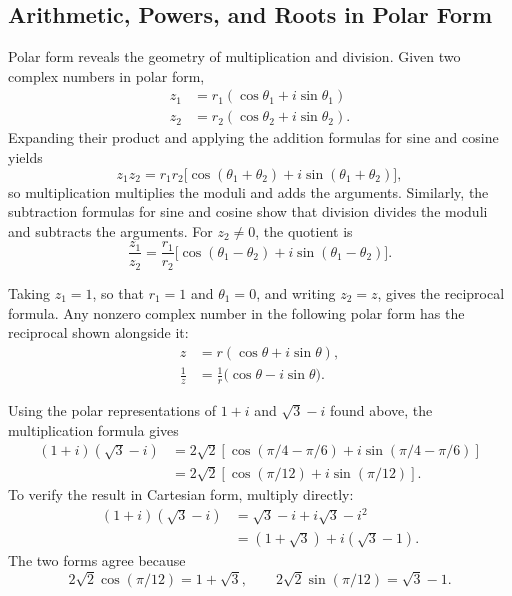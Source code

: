 \subsection{Arithmetic, Powers, and Roots in Polar Form}

Polar form reveals the geometry of multiplication and division. Given two complex numbers in polar form,
\[
\begin{aligned}
z_1 &= r_1(\cos\theta_1 + i\sin\theta_1) \\
z_2 &= r_2(\cos\theta_2 + i\sin\theta_2).
\end{aligned}
\]
Expanding their product and applying the addition formulas for sine and cosine yields
\[
z_1 z_2 = r_1 r_2 \big[ \cos(\theta_1+\theta_2) + i \sin(\theta_1+\theta_2) \big],
\] so multiplication multiplies the moduli and adds the arguments. Similarly, the subtraction formulas for sine and cosine show that division
divides the moduli and subtracts the arguments. For $z_2 \neq 0$, the quotient is
\[
\frac{z_1}{z_2} = \frac{r_1}{r_2} \big[ \cos(\theta_1-\theta_2) + i \sin(\theta_1-\theta_2) \big].
\]

Taking $z_1 = 1$, so that $r_1 = 1$ and $\theta_1 = 0$, and writing $z_2 = z$, gives the reciprocal formula. Any nonzero complex number in the following polar form has the reciprocal shown alongside it:
\[
\begin{aligned}
z &= r(\cos\theta + i \sin \theta), \\
\frac{1}{z} &= \frac{1}{r} \big( \cos\theta - i \sin\theta \big).
\end{aligned}
\]

\begin{example}
Using the polar representations of $1+i$ and $\sqrt{3}-i$ found above, the multiplication formula gives
\[
\begin{aligned}
(1+i)(\sqrt{3}-i) &= 2\sqrt{2} \left[ \cos(\pi/4 - \pi/6) + i \sin(\pi/4-\pi/6) \right] \\
&= 2\sqrt{2} \left[ \cos(\pi/12) + i \sin(\pi/12) \right].
\end{aligned}
\]
To verify the result in Cartesian form, multiply directly:
\[
\begin{aligned}
(1+i)(\sqrt{3}-i)
&=\sqrt{3}-i+i\sqrt{3}-i^2\\
&=(1+\sqrt{3})+i(\sqrt{3}-1).
\end{aligned}
\]
The two forms agree because
\[
2\sqrt{2}\cos(\pi/12)=1+\sqrt{3},\qquad
2\sqrt{2}\sin(\pi/12)=\sqrt{3}-1.
\]

\end{example}

